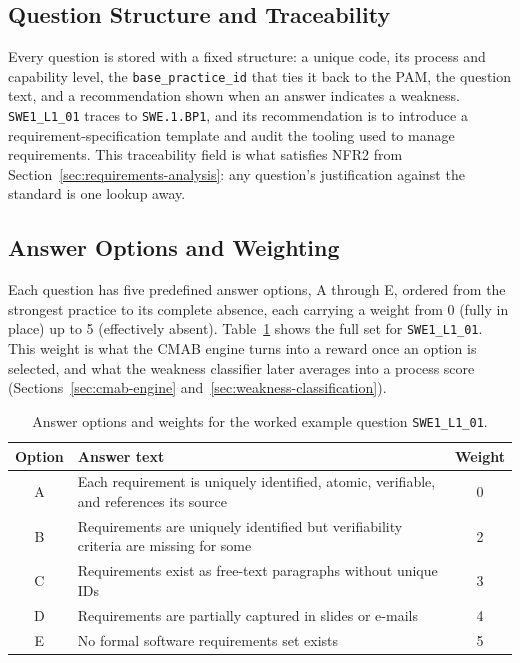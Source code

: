 \documentclass[a4paper, 12pt, oneside, openany, BCOR1cm,toc=chapterentrywithdots]{scrbook}
\begin{document}
\subsection{Question Structure and Traceability}

Every question is stored with a fixed structure: a unique code, its process and capability
level, the \texttt{base\_practice\_id} that ties it back to the PAM, the question text, and a
recommendation shown when an answer indicates a weakness. \texttt{SWE1\_L1\_01} traces to
\texttt{SWE.1.BP1}, and its recommendation is to introduce a requirement-specification template
and audit the tooling used to manage requirements. This traceability field is what satisfies
NFR2 from Section~\ref{sec:requirements-analysis}: any question's justification against the
standard is one lookup away.

\subsection{Answer Options and Weighting}
\label{sec:answer-weighting}

Each question has five predefined answer options, A through E, ordered from the strongest
practice to its complete absence, each carrying a weight from 0 (fully in place) up to 5
(effectively absent). Table~\ref{tab:example-question} shows the full set for
\texttt{SWE1\_L1\_01}. This weight is what the CMAB engine turns into a reward once an option is
selected, and what the weakness classifier later averages into a process score
(Sections~\ref{sec:cmab-engine} and~\ref{sec:weakness-classification}).

\begin{table}[h]
\centering
\caption{Answer options and weights for the worked example question \texttt{SWE1\_L1\_01}.}
\label{tab:example-question}
\begin{tabular}{|c|p{8.5cm}|c|}
\hline
\textbf{Option} & \textbf{Answer text} & \textbf{Weight} \\
\hline
A & Each requirement is uniquely identified, atomic, verifiable, and references its source & 0 \\
\hline
B & Requirements are uniquely identified but verifiability criteria are missing for some & 2 \\
\hline
C & Requirements exist as free-text paragraphs without unique IDs & 3 \\
\hline
D & Requirements are partially captured in slides or e-mails & 4 \\
\hline
E & No formal software requirements set exists & 5 \\
\hline
\end{tabular}
\end{table}
\end{document}
